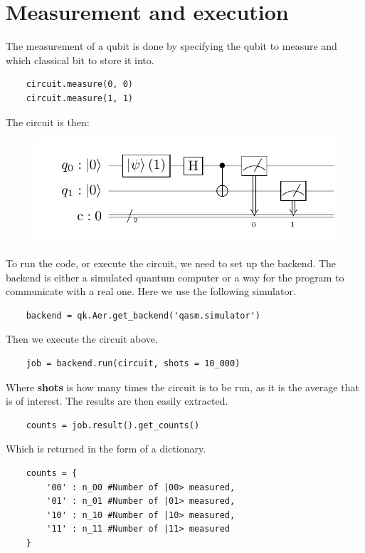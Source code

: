 \section{Measurement and execution}

The measurement of a qubit is done by specifying the qubit to measure and which classical bit to store it into.

\begin{verbatim}
    circuit.measure(0, 0)
    circuit.measure(1, 1)
\end{verbatim}

The circuit is then:

\begin{figure}[H]
    \centering
    \includegraphics{Figures/Circuits/implementation/2measure.pdf}
\end{figure}

To run the code, or execute the circuit, we need to set up the backend. The backend is either a simulated quantum computer or a way for the program to communicate with a real one. Here we use the following simulator.

\begin{verbatim}
    backend = qk.Aer.get_backend('qasm.simulator')
\end{verbatim}

Then we execute the circuit above.

\begin{verbatim}
    job = backend.run(circuit, shots = 10_000)
\end{verbatim}

Where \textbf{shots} is how many times the circuit is to be run, as it is the average that is of interest. The results are then easily extracted.

\begin{verbatim}
    counts = job.result().get_counts()
\end{verbatim}

Which is returned in the form of a dictionary.

\begin{verbatim}
    counts = {
        '00' : n_00 #Number of |00> measured,
        '01' : n_01 #Number of |01> measured,
        '10' : n_10 #Number of |10> measured,
        '11' : n_11 #Number of |11> measured
    }
\end{verbatim}

